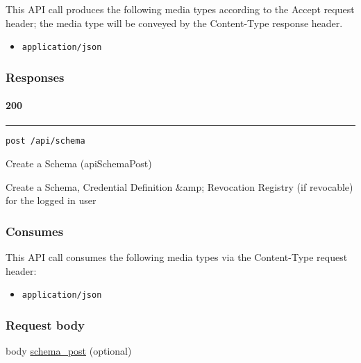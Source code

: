 This API call produces the following media types according to the
{Accept} request header; the media type will be conveyed by the
{Content-Type} response header.

\begin{itemize}
\tightlist
\item
  \texttt{application/json}
\end{itemize}

\hypertarget{responses-142}{%
\subsubsection{Responses}\label{responses-142}}

\hypertarget{section-460}{%
\paragraph{200}\label{section-460}}

\begin{center}\rule{0.5\linewidth}{\linethickness}\end{center}

\protect\hypertarget{apiSchemaPost}{}{}

\begin{verbatim}
post /api/schema
\end{verbatim}

Create a Schema ({apiSchemaPost})

Create a Schema, Credential Definition \&amp; Revocation Registry (if
revocable) for the logged in user

\hypertarget{consumes-43}{%
\subsubsection{Consumes}\label{consumes-43}}

This API call consumes the following media types via the {Content-Type}
request header:

\begin{itemize}
\tightlist
\item
  \texttt{application/json}
\end{itemize}

\hypertarget{request-body-43}{%
\subsubsection{Request body}\label{request-body-43}}

body \protect\hyperlink{schema_post}{schema\_post} (optional)

